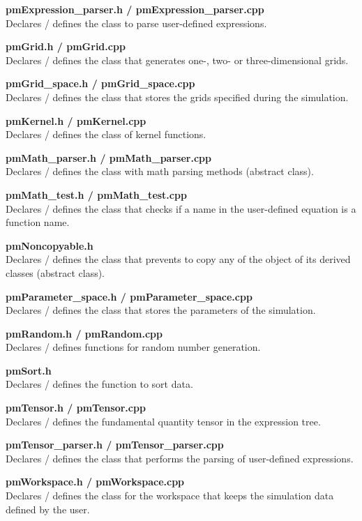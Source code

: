 \documentclass[a4paper,12pt,openany]{book}
\theoremstyle{break}
\begin{document}
\textbf{pmExpression\_parser.h / pmExpression\_parser.cpp} \\
Declares / defines the class to parse user-defined expressions.

\textbf{pmGrid.h / pmGrid.cpp} \\
Declares / defines the class that generates one-, two- or three-dimensional grids.

\textbf{pmGrid\_space.h / pmGrid\_space.cpp} \\
Declares / defines the class that stores the grids specified during the simulation.

\textbf{pmKernel.h / pmKernel.cpp} \\
Declares / defines the class of kernel functions.

\textbf{pmMath\_parser.h / pmMath\_parser.cpp} \\
Declares / defines the class with math parsing methods (abstract class).

\textbf{pmMath\_test.h / pmMath\_test.cpp} \\
Declares / defines the class that checks if a name in the user-defined equation is a function name.

\textbf{pmNoncopyable.h} \\
Declares / defines the class that prevents to copy any of the object of its derived classes (abstract class).

\textbf{pmParameter\_space.h / pmParameter\_space.cpp} \\
Declares / defines the class that stores the parameters of the simulation.

\textbf{pmRandom.h / pmRandom.cpp} \\
Declares / defines functions for random number generation.

\textbf{pmSort.h} \\
Declares / defines the function to sort data.

\textbf{pmTensor.h / pmTensor.cpp} \\
Declares / defines the fundamental quantity tensor in the expression tree.

\textbf{pmTensor\_parser.h / pmTensor\_parser.cpp} \\
Declares / defines the class that performs the parsing of user-defined expressions.

\textbf{pmWorkspace.h / pmWorkspace.cpp} \\
Declares / defines the class for the workspace that keeps the simulation data defined by the user.
\end{document}
